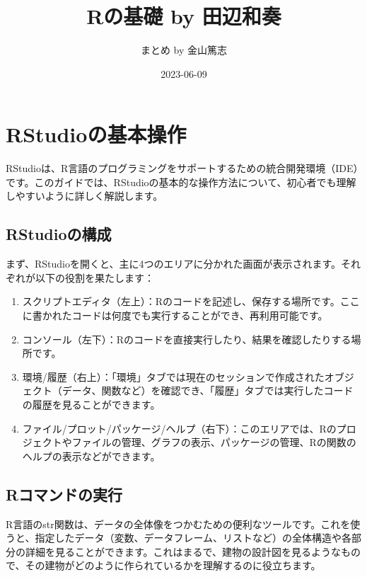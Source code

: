 \documentclass[
]{article}
\title{Rの基礎 by 田辺和奏}
\author{まとめ by 金山篤志}
\date{2023-06-09}
\providecommand{\tightlist}{%
  \setlength{\itemsep}{0pt}\setlength{\parskip}{0pt}}
\begin{document}
\maketitle

{
\setcounter{tocdepth}{2}
\tableofcontents
}
\hypertarget{rstudioux306eux57faux672cux64cdux4f5c}{%
\section{RStudioの基本操作}\label{rstudioux306eux57faux672cux64cdux4f5c}}

RStudioは、R言語のプログラミングをサポートするための統合開発環境（IDE）です。このガイドでは、RStudioの基本的な操作方法について、初心者でも理解しやすいように詳しく解説します。

\hypertarget{rstudioux306eux69cbux6210}{%
\subsection{RStudioの構成}\label{rstudioux306eux69cbux6210}}

まず、RStudioを開くと、主に4つのエリアに分かれた画面が表示されます。それぞれが以下の役割を果たします：

\begin{enumerate}
\def\labelenumi{\arabic{enumi}.}
\tightlist
\item
  スクリプトエディタ（左上）：Rのコードを記述し、保存する場所です。ここに書かれたコードは何度でも実行することができ、再利用可能です。
\item
  コンソール（左下）：Rのコードを直接実行したり、結果を確認したりする場所です。
\item
  環境/履歴（右上）：「環境」タブでは現在のセッションで作成されたオブジェクト（データ、関数など）を確認でき、「履歴」タブでは実行したコードの履歴を見ることができます。
\item
  ファイル/プロット/パッケージ/ヘルプ（右下）：このエリアでは、Rのプロジェクトやファイルの管理、グラフの表示、パッケージの管理、Rの関数のヘルプの表示などができます。
\end{enumerate}

\hypertarget{rux30b3ux30deux30f3ux30c9ux306eux5b9fux884c}{%
\subsection{Rコマンドの実行}\label{rux30b3ux30deux30f3ux30c9ux306eux5b9fux884c}}

R言語のstr関数は、データの全体像をつかむための便利なツールです。これを使うと、指定したデータ（変数、データフレーム、リストなど）の全体構造や各部分の詳細を見ることができます。これはまるで、建物の設計図を見るようなもので、その建物がどのように作られているかを理解するのに役立ちます。
\end{document}

